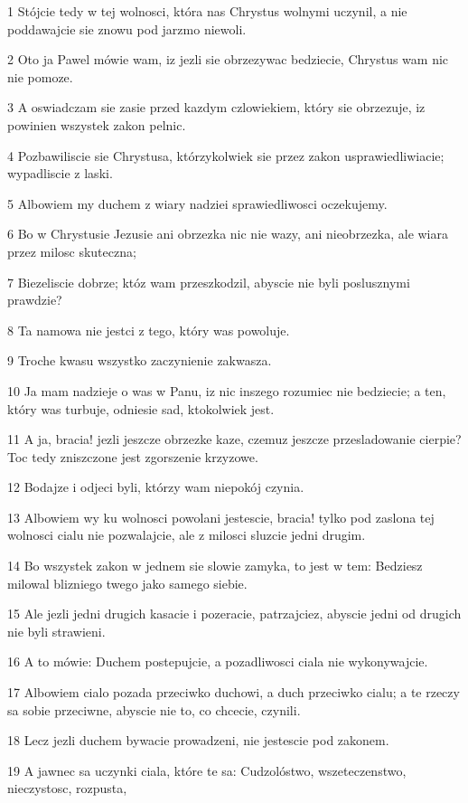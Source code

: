 \par 1 Stójcie tedy w tej wolnosci, która nas Chrystus wolnymi uczynil, a nie poddawajcie sie znowu pod jarzmo niewoli.
\par 2 Oto ja Pawel mówie wam, iz jezli sie obrzezywac bedziecie, Chrystus wam nic nie pomoze.
\par 3 A oswiadczam sie zasie przed kazdym czlowiekiem, który sie obrzezuje, iz powinien wszystek zakon pelnic.
\par 4 Pozbawiliscie sie Chrystusa, którzykolwiek sie przez zakon usprawiedliwiacie; wypadliscie z laski.
\par 5 Albowiem my duchem z wiary nadziei sprawiedliwosci oczekujemy.
\par 6 Bo w Chrystusie Jezusie ani obrzezka nic nie wazy, ani nieobrzezka, ale wiara przez milosc skuteczna;
\par 7 Biezeliscie dobrze; któz wam przeszkodzil, abyscie nie byli poslusznymi prawdzie?
\par 8 Ta namowa nie jestci z tego, który was powoluje.
\par 9 Troche kwasu wszystko zaczynienie zakwasza.
\par 10 Ja mam nadzieje o was w Panu, iz nic inszego rozumiec nie bedziecie; a ten, który was turbuje, odniesie sad, ktokolwiek jest.
\par 11 A ja, bracia! jezli jeszcze obrzezke kaze, czemuz jeszcze przesladowanie cierpie? Toc tedy zniszczone jest zgorszenie krzyzowe.
\par 12 Bodajze i odjeci byli, którzy wam niepokój czynia.
\par 13 Albowiem wy ku wolnosci powolani jestescie, bracia! tylko pod zaslona tej wolnosci cialu nie pozwalajcie, ale z milosci sluzcie jedni drugim.
\par 14 Bo wszystek zakon w jednem sie slowie zamyka, to jest w tem: Bedziesz milowal blizniego twego jako samego siebie.
\par 15 Ale jezli jedni drugich kasacie i pozeracie, patrzajciez, abyscie jedni od drugich nie byli strawieni.
\par 16 A to mówie: Duchem postepujcie, a pozadliwosci ciala nie wykonywajcie.
\par 17 Albowiem cialo pozada przeciwko duchowi, a duch przeciwko cialu; a te rzeczy sa sobie przeciwne, abyscie nie to, co chcecie, czynili.
\par 18 Lecz jezli duchem bywacie prowadzeni, nie jestescie pod zakonem.
\par 19 A jawnec sa uczynki ciala, które te sa: Cudzolóstwo, wszeteczenstwo, nieczystosc, rozpusta,

